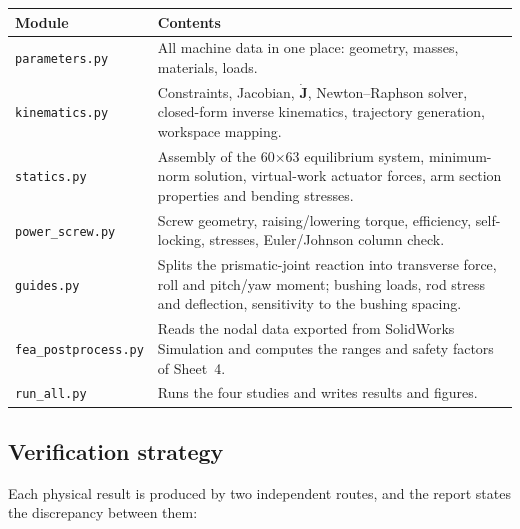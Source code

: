 \documentclass[11pt]{article}
\begin{document}
\begin{center}
\begin{tabular}{@{}l>{\raggedright\arraybackslash}p{9.6cm}@{}}
\toprule
\textbf{Module} & \textbf{Contents} \\
\midrule
\texttt{parameters.py}     & All machine data in one place: geometry, masses, materials, loads. \\
\texttt{kinematics.py}     & Constraints, Jacobian, $\dot{\bm J}$, Newton--Raphson solver, closed-form inverse kinematics, trajectory generation, workspace mapping. \\
\texttt{statics.py}        & Assembly of the 60$\times$63 equilibrium system, minimum-norm solution, virtual-work actuator forces, arm section properties and bending stresses. \\
\texttt{power\_screw.py}   & Screw geometry, raising/lowering torque, efficiency, self-locking, stresses, Euler/Johnson column check. \\
\texttt{guides.py}         & Splits the prismatic-joint reaction into transverse force, roll and pitch/yaw moment; bushing loads, rod stress and deflection, sensitivity to the bushing spacing. \\
\texttt{fea\_postprocess.py}& Reads the nodal data exported from SolidWorks Simulation and computes the ranges and safety factors of Sheet~4. \\
\texttt{run\_all.py}       & Runs the four studies and writes results and figures. \\
\bottomrule
\end{tabular}
\end{center}

\subsection{Verification strategy}

Each physical result is produced by two independent routes, and the report states the
discrepancy between them:
\end{document}

